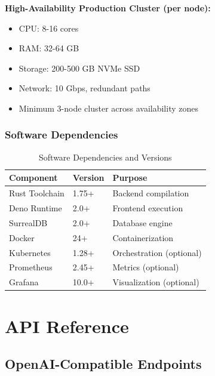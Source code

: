 \documentclass[12pt,a4paper,twoside]{report}
\begin{document}
\textbf{High-Availability Production Cluster (per node):}
\begin{itemize}[leftmargin=*]
    \item CPU: 8-16 cores
    \item RAM: 32-64 GB
    \item Storage: 200-500 GB NVMe SSD
    \item Network: 10 Gbps, redundant paths
    \item Minimum 3-node cluster across availability zones
\end{itemize}

\subsection{Software Dependencies}

\begin{table}[h]
\centering
\begin{tabular}{@{}p{3.5cm}p{3cm}p{5cm}@{}}
\toprule
\textbf{Component} & \textbf{Version} & \textbf{Purpose} \\
\midrule
Rust Toolchain & 1.75+ & Backend compilation \\
Deno Runtime & 2.0+ & Frontend execution \\
SurrealDB & 2.0+ & Database engine \\
Docker & 24+ & Containerization \\
Kubernetes & 1.28+ & Orchestration (optional) \\
Prometheus & 2.45+ & Metrics (optional) \\
Grafana & 10.0+ & Visualization (optional) \\
\bottomrule
\end{tabular}
\caption{Software Dependencies and Versions}
\label{tab:dependencies}
\end{table}


\appendix

\chapter{API Reference}

\section{OpenAI-Compatible Endpoints}
\end{document}

